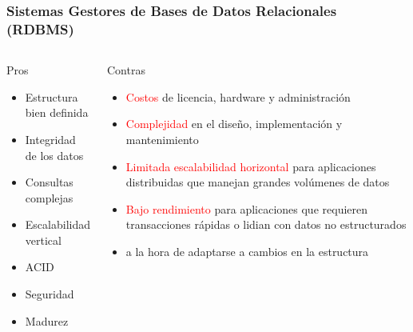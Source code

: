\begin{frame}
    \frametitle{Sistemas Gestores de Bases de Datos Relacionales (RDBMS)}

    \begin{columns}[t]
        \begin{exampleblock}{Pros}
            \begin{itemize}[<+(1)->]
                \item Estructura bien definida 

                \item Integridad de los datos 

                \item Consultas complejas 

                \item Escalabilidad vertical

                \item ACID 

                \item Seguridad 

                \item Madurez
            \end{itemize}
        \end{exampleblock}
        \begin{alertblock}{Contras}
            \begin{itemize}[<+(1)->]
                \item \textcolor<-13>{red}{Costos} de licencia, hardware y administración 
                \item \textcolor<-13>{red}{Complejidad} en el dise\~no, implementación y mantenimiento
                \item \textcolor{red}{Limitada escalabilidad horizontal} para aplicaciones distribuidas que manejan grandes volúmenes de datos 
                \item \textcolor<-13>{red}{Bajo rendimiento} para aplicaciones que requieren transacciones r\'apidas o lidian con datos no estructurados
                \item {} a la hora de adaptarse a cambios en la estructura
            \end{itemize}
        \end{alertblock}
    \end{columns}

    \pause
\end{frame}